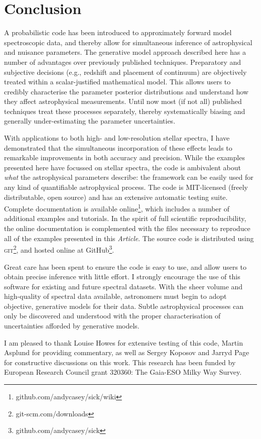 \documentclass{aastex}
\newcommand{\article}{\textit{Article}}
\begin{document}
\section{Conclusion}
\label{sec:conclusions}

A probabilistic code has been introduced to approximately forward model spectroscopic data, and thereby allow for simultaneous inference of astrophysical and nuisance parameters. The generative model approach described here has a number of advantages over previously published techniques. Preparatory and subjective decisions (e.g., redshift and placement of continuum) are objectively treated within a scalar-justified mathematical model. This allows users to credibly characterise the parameter posterior distributions and understand how they affect astrophysical measurements. Until now most (if not all) published techniques treat these processes separately, thereby systematically biasing and generally under-estimating the parameter uncertainties.

With applications to both high- and low-resolution stellar spectra, I have demonstrated that the simultaneous incorporation of these effects leads to remarkable improvements in both accuracy and precision. While the examples presented here have focussed on stellar spectra, the code is ambivalent about \textit{what} the astrophysical parameters describe: the framework can be easily used for any kind of quantifiable astrophysical process. The code is MIT-licensed (freely distributable, open source) and has an extensive automatic testing suite. Complete documentation is available online\footnote{github.com/andycasey/sick/wiki}, which includes a number of additional examples and tutorials. In the spirit of full scientific reproducibility, the online documentation is complemented with the files necessary to reproduce all of the examples presented in this \article{}. The source code is distributed using \textsc{git}\footnote{git-scm.com/downloads}, and hosted online at GitHub\footnote{github.com/andycasey/sick}. 

Great care has been spent to ensure the code is easy to use, and allow users to obtain precise inference with little effort. I strongly encourage the use of this software for existing and future spectral datasets. With the sheer volume and high-quality of spectral data available, astronomers must begin to adopt objective, generative models for their data. Subtle astrophysical processes can only be discovered and understood with the proper characterisation of uncertainties afforded by generative models.

\acknowledgements
I am pleased to thank Louise Howes for extensive testing of this code, Martin Asplund for providing commentary, as well as Sergey Koposov and Jarryd Page for constructive discussions on this work. This research has been funded by European Research Council grant 320360: The Gaia-ESO Milky Way Survey. 





\end{document}

